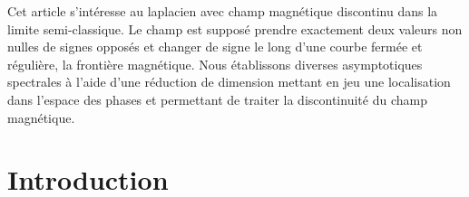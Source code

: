 \documentclass[JEP,XML,SOM,Unicode,NoFloatCountersInSection,published]{cedram}
\theoremstyle{plain}
\theoremstyle{definition}
\begin{document}




\begin{altabstract}
Cet article s'intéresse au laplacien avec champ magnétique discontinu dans la limite semi-classique. Le champ est supposé prendre exactement deux valeurs non nulles de signes opposés et changer de signe le long d'une courbe fermée et régulière, la \og frontière magnétique\fg. Nous établissons diverses asymptotiques spectrales à l'aide d'une réduction de dimension mettant en jeu une localisation dans l'espace des phases et permettant de traiter la discontinuité du champ magnétique.
\end{altabstract}

\maketitle
\tableofcontents
\mainmatter

\section{Introduction}\label{sec:intro}
\end{document}
